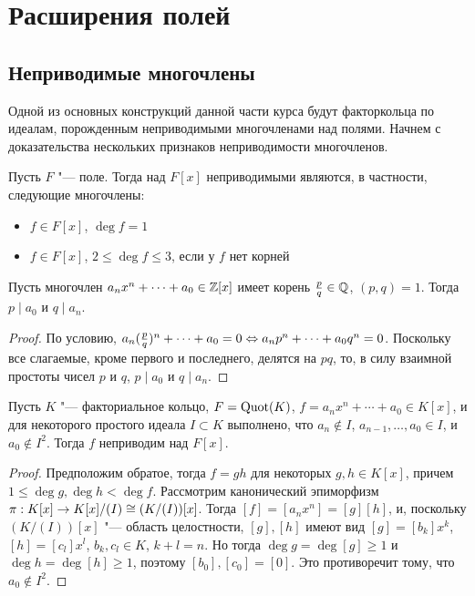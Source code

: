 \section{Расширения полей}

\subsection{Неприводимые многочлены}

Одной из основных конструкций данной части курса будут факторкольца по идеалам, порожденным неприводимыми многочленами над полями. Начнем с доказательства нескольких признаков неприводимости многочленов.

\begin{note}
	Пусть $F$ "--- поле. Тогда над $F[x]$ неприводимыми являются, в частности, следующие многочлены:
	\begin{itemize}
		\item $f \in F[x]$, $\deg{f} = 1$
		\item $f \in F[x]$, $2 \le \deg{f} \le 3$, если у $f$ нет корней
	\end{itemize}
\end{note}

\begin{proposition}
	Пусть многочлен $a_nx^n + \dotsb + a_0 \in \mathbb{Z}[x]$ имеет корень $\frac{p}{q} \in \mathbb{Q}$, $(p, q) = 1$. Тогда $p \mid a_0$ и $q \mid a_n$.
\end{proposition}

\begin{proof}
	По условию, $a_n(\frac{p}{q})^n + \dotsb + a_0 = 0 \Leftrightarrow a_np^n + \dotsb + a_0q^n = 0$. Поскольку все слагаемые, кроме первого и последнего, делятся на $pq$, то, в силу взаимной простоты чисел $p$ и $q$, $p \mid a_0$ и $q \mid a_n$.
\end{proof}

\begin{proposition}
	Пусть $K$ "--- факториальное кольцо, $F \hm= \mathrm{Quot}(K)$, $f = a_nx^n + \dotsb + a_0 \in K[x]$, и для некоторого простого идеала $I \subset K$ выполнено, что $a_n \not\in I$, $a_{n - 1}, \dotsc, a_0 \in I$, и $a_0 \not\in I^2$. Тогда $f$ неприводим над $F[x]$.
\end{proposition}

\begin{proof}
	Предположим обратое, тогда $f = gh$ для некоторых $g, h \in K[x]$, причем $1 \le \deg{g}, \deg{h} < \deg{f}$. Рассмотрим канонический эпиморфизм $\pi: K[x] \to K[x] / (I) \hm\cong (K / (I))[x]$. Тогда $[f] = [a_nx^n] = [g][h]$, и, поскольку $(K / (I))[x]$ "--- область целостности, $[g], [h]$ имеют вид $[g] = [b_k]x^k$, $[h] = [c_l]x^l$, $b_k, c_l \in K$, $k + l = n$. Но тогда $\deg{g} = \deg[g] \ge 1$ и $\deg{h} = \deg[h] \ge 1$, поэтому $[b_0], [c_0] = [0]$. Это противоречит тому, что $a_0 \not\in I^2$.
\end{proof}

